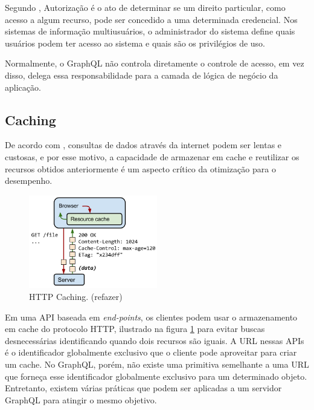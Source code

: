 Segundo , Autorização é o ato de determinar se um direito particular, como acesso a algum recurso, pode ser concedido a uma determinada credencial. Nos sistemas de informação multiusuários, o administrador do sistema define quais usuários podem ter acesso ao sistema e quais são os privilégios de uso.

Normalmente, o GraphQL não controla diretamente o controle de acesso, em vez disso, delega essa responsabilidade para a camada de lógica de negócio da aplicação. 

\subsection{Caching}

De acordo com , consultas de dados através da internet podem ser lentas e custosas, e por esse motivo, a capacidade de armazenar em cache e reutilizar os recursos obtidos anteriormente é um aspecto crítico da otimização para o desempenho.

\begin{figure}[htbp]
\centering
\includegraphics[width=0.5\textwidth]{figuras/cache-http.png}
\caption{HTTP Caching. (refazer)}
\label{fig:cache-http}
\author{https://developers.google.com/web/fundamentals/performance/optimizing-content-efficiency/http-caching}
\end{figure}

Em uma API baseada em \textit{end-points}, os clientes podem usar o armazenamento em cache do protocolo HTTP, ilustrado na figura \ref{fig:cache-http} para evitar buscas desnecessárias identificando quando dois recursos são iguais. A URL nessas APIs é o identificador globalmente exclusivo que o cliente pode aproveitar para criar um cache. No GraphQL, porém, não existe uma primitiva semelhante a uma URL que forneça esse identificador globalmente exclusivo para um determinado objeto. Entretanto, existem várias práticas que podem ser aplicadas a um servidor GraphQL para atingir o mesmo objetivo.

